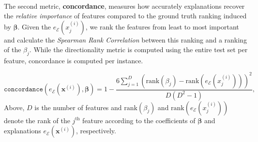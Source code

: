 \documentclass[mnsc,blindrev]{informs3}
\newcommand{\mE}{\mathcal{E}}
\begin{document}
      The second metric, \textbf{concordance}, measures how accurately explanations recover the \textit{relative importance} of features compared to the ground truth ranking induced by $\boldsymbol{\beta}$. Given the $e_\mathcal{E}(x^{(i)}_j)$, we rank the features from least to most important and calculate the \emph{Spearman Rank Correlation} \citep{spearman1904proof} between this ranking and a ranking of the $\beta_j$. While the directionality metric is computed using the entire test set per feature, concordance is computed per instance.

    \begin{equation}
       \texttt{concordance}(e_\mE(\mathbf{x}^{(i)}),\boldsymbol{\beta}) = 1 - \frac{6\sum_{j=1}^D (\text{rank}(\beta_j) - \text{rank}(e_\mE(x^{(i)}_j)))^2}{D(D^2-1)},
    \end{equation}
    Above, $D$ is the number of features and $\text{rank}(\beta_j)$ and $\text{rank}(e_\mE(x^{(i)}_j))$ denote the rank of the $j^{\text{th}}$ feature according to the coefficients of $\boldsymbol{\beta}$ and explanations $e_\mE(\mathbf{x}^{(i)})$, respectively. %
    
    
\end{document}
